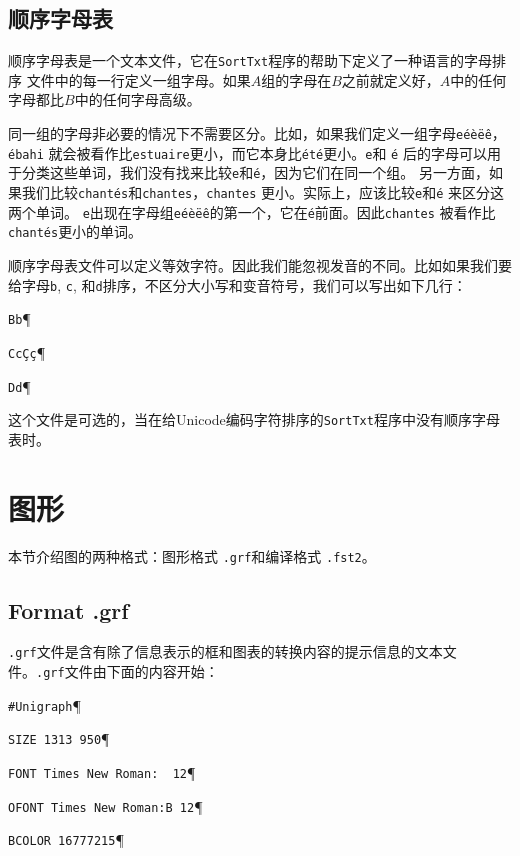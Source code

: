 \subsection{顺序字母表}
顺序字母表是一个文本文件，它在\verb+SortTxt+程序的帮助下定义了一种语言的字母排序 文件中的每一行定义一组字母。如果$A$组的字母在$B$之前就定义好，$A$中的任何字母都比$B$中的任何字母高级。

\bigskip
\noindent
同一组的字母非必要的情况下不需要区分。比如，如果我们定义一组字母\verb+eéèëê+，\verb+ébahi+
就会被看作比\verb+estuaire+更小，而它本身比\verb+été+更小。\verb+e+和 \verb+é+ 后的字母可以用于分类这些单词，我们没有找来比较\verb+e+和\verb+é+，因为它们在同一个组。
另一方面，如果我们比较\verb+chantés+和\verb+chantes+，\verb+chantes+ 更小。实际上，应该比较\verb+e+和\verb+é+ 来区分这两个单词。 \verb+e+出现在字母组\verb+eéèëê+的第一个，它在\verb+é+前面。因此\verb+chantes+ 
被看作比 \verb+chantés+更小的单词。

\bigskip
\noindent
顺序字母表文件可以定义等效字符。因此我们能忽视发音的不同。比如如果我们要给字母\verb+b+, \verb+c+, 和\verb+d+排序，不区分大小写和变音符号，我们可以写出如下几行：

\bigskip
\noindent
\texttt{Bb}\P

\noindent
\texttt{Cc\c{C}\c{c}}\P

\noindent
\texttt{Dd}\P

\bigskip
\noindent 
这个文件是可选的，当在给Unicode编码字符排序的\verb+SortTxt+程序中没有顺序字母表时。

\section{图形}
本节介绍图的两种格式：图形格式 \verb+.grf+和编译格式 \verb+.fst2+。


\subsection{Format .grf}
\verb+.grf+文件是含有除了信息表示的框和图表的转换内容的提示信息的文本文件。\verb+.grf+文件由下面的内容开始：


\bigskip
\verb+#Unigraph+\P

\verb+SIZE 1313 950+\P

\verb+FONT Times New Roman:  12+\P

\verb+OFONT Times New Roman:B 12+\P

\verb+BCOLOR 16777215+\P

